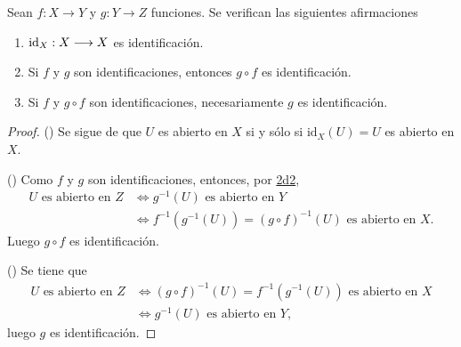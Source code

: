 
\begin{proposition}
Sean $f : X \longrightarrow Y$ y $g : Y \longrightarrow Z$ funciones. Se verifican las siguientes afirmaciones
\begin{enumerate}[label=\textnormal{(\roman*)}]
\item $\textnormal{id}_X : X \longrightarrow X$ es identificación.
\item Si $f$ y $g$ son identificaciones, entonces $g \circ f$ es identificación.
\item Si $f$ y $g \circ f$ son identificaciones, necesariamente $g$ es identificación.
\end{enumerate}
\end{proposition}

\begin{proof}
({}) Se sigue de que $U$ es abierto en $X$ si y sólo si $\text{id}_X(U) = U$ es abierto en $X$.
\bigskip

({}) Como $f$ y $g$ son identificaciones, entonces, por \hyperref[card:2d2]{\textsf{2d2}},
\begin{align*}
    U \text{ es abierto en } Z & \iff g^{-1}(U) \text{ es abierto en } Y \\
                               & \iff f^{-1}(g^{-1}(U)) = (g \circ f)^{-1}(U) \text{ es abierto en } X.
\end{align*}
Luego $g \circ f$ es identificación.
\bigskip

({}) Se tiene que
\begin{align*}
    U \text{ es abierto en } Z & \iff (g \circ f)^{-1}(U) = f^{-1}(g^{-1}(U)) \text{ es abierto en } X \\
                               & \iff g^{-1}(U) \text{ es abierto en } Y,
\end{align*}
luego $g$ es identificación.
\end{proof}
